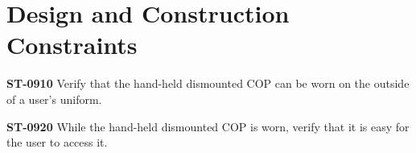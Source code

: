 \section{Design and Construction Constraints}

\textbf{ST-0910} Verify that the hand-held dismounted COP can be worn on the outside of a user's uniform. 

\textbf{ST-0920} While the hand-held dismounted COP is worn, verify that it is easy for the user to access it. 